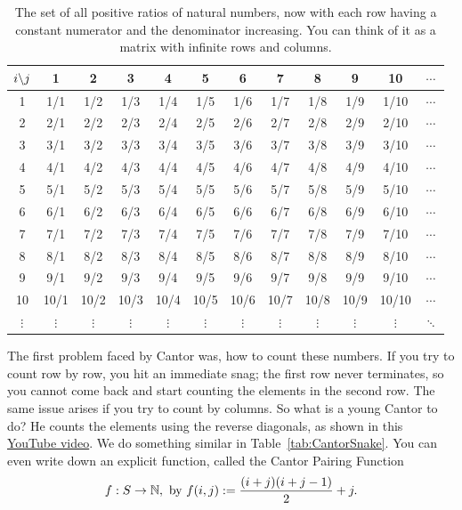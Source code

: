 \begin{table}[ht]
\centering
\renewcommand{\arraystretch}{1.5}
\begin{tabular}{c | *{11}{@{\hspace{5mm}}c}}
$\mathlarger{i \mathbf{\backslash} j}$  & 1 & 2 & 3 & 4 & 5 & 6 & 7 & 8 & 9 & 10 & $\cdots$\\
 & 1/1 & 1/2 & 1/3 & 1/4 & 1/5 & 1/6 & 1/7 & 1/8 & 1/9 & 1/10 & $\cdots$\\ 
2 & 2/1 & 2/2 & 2/3 & 2/4 & 2/5 & 2/6 & 2/7 & 2/8 & 2/9 & 2/10 & $\cdots$\\ 
3 & 3/1 & 3/2 & 3/3 & 3/4 & 3/5 & 3/6 & 3/7 & 3/8 & 3/9 & 3/10 & $\cdots$\\ 
4 & 4/1 & 4/2 & 4/3 & 4/4 & 4/5 & 4/6 & 4/7 & 4/8 & 4/9 & 4/10 & $\cdots$\\ 
5 & 5/1 & 5/2 & 5/3 & 5/4 & 5/5 & 5/6 & 5/7 & 5/8 & 5/9 & 5/10 & $\cdots$\\ 
6 & 6/1 & 6/2 & 6/3 & 6/4 & 6/5 & 6/6 & 6/7 & 6/8 & 6/9 & 6/10 & $\cdots$\\ 
7 & 7/1 & 7/2 & 7/3 & 7/4 & 7/5 & 7/6 & 7/7 & 7/8 & 7/9 & 7/10 & $\cdots$\\ 
8 & 8/1 & 8/2 & 8/3 & 8/4 & 8/5 & 8/6 & 8/7 & 8/8 & 8/9 & 8/10 & $\cdots$\\ 
9 & 9/1 & 9/2 & 9/3 & 9/4 & 9/5 & 9/6 & 9/7 & 9/8 & 9/9 & 9/10 & $\cdots$\\ 
10 & 10/1 & 10/2 & 10/3 & 10/4 & 10/5 & 10/6 & 10/7 & 10/8 & 10/9 & 10/10 & $\cdots$ \\ 
$\vdots$ & $\vdots$ & $\vdots$ & $\vdots$ & $\vdots$ & $\vdots$ & $\vdots$ & $\vdots$ & $\vdots$ & $\vdots$ & $\vdots$ & $\ddots$ \\
\end{tabular}
\caption{The set of all positive ratios of natural numbers, now with each row having a constant numerator and the denominator increasing. You can think of it as a matrix with infinite rows and columns.}
\label{tab:AllPositiveRatios}
\end{table}


\vspace{1cm}

The first problem faced by Cantor was, how to count these numbers. If you try to count row by row, you hit an immediate snag; the first row never terminates, so you cannot come back and start counting the elements in the second row. The same issue arises if you try to count by columns. So what is a young Cantor to do? He counts the elements using the reverse diagonals, as shown in this \href{https://youtu.be/pyctG41q9os}{YouTube 
 video}. We do something similar in Table~\ref{tab:CantorSnake}. You can even write down an explicit function, called the Cantor Pairing Function
\begin{equation}
\label{eqn:CantorPairingFunction}
    f:S \to \mathbb N, \text{ by } f(i,j):= \frac{ (i+j) (i+j-1) }{2} +j.
\end{equation} 

